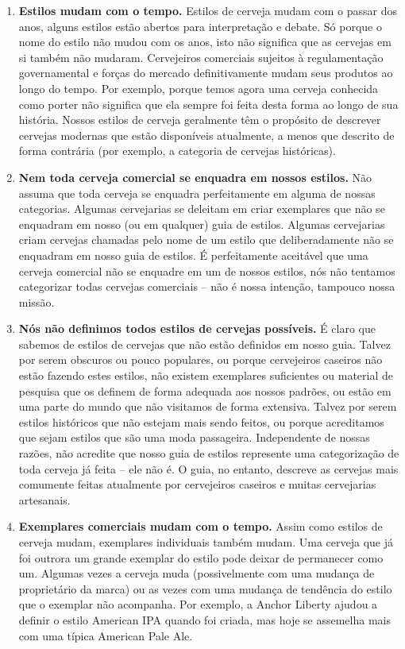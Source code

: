 \begin{enumerate}
\item \textbf{Estilos mudam com o tempo.} Estilos de cerveja mudam com o passar dos anos, alguns estilos estão abertos para interpretação e debate. Só porque o nome do estilo não mudou com os anos, isto não significa que as cervejas em si também não mudaram. Cervejeiros comerciais sujeitos à regulamentação governamental e forças do mercado definitivamente mudam seus produtos ao longo do tempo. Por exemplo, porque temos agora uma cerveja conhecida como porter não significa que ela sempre foi feita desta forma ao longo de sua história. Nossos estilos de cerveja geralmente têm o propósito de descrever cervejas modernas que estão disponíveis atualmente, a menos que descrito de forma contrária (por exemplo, a categoria de cervejas históricas).
\item \textbf{Nem toda cerveja comercial se enquadra em nossos estilos.} Não assuma que toda cerveja se enquadra perfeitamente em alguma de nossas categorias. Algumas cervejarias se deleitam em criar exemplares que não se enquadram em nosso (ou em qualquer) guia de estilos. Algumas cervejarias criam cervejas chamadas pelo nome de um estilo que deliberadamente não se enquadram em nosso guia de estilos. É perfeitamente aceitável que uma cerveja comercial não se enquadre em um de nossos estilos, nós não tentamos categorizar todas cervejas comerciais – não é nossa intenção, tampouco nossa missão.
\item \textbf{Nós não definimos todos estilos de cervejas possíveis.} É claro que sabemos de estilos de cervejas que não estão definidos em nosso guia. Talvez por serem obscuros ou pouco populares, ou porque cervejeiros caseiros não estão fazendo estes estilos, não existem exemplares suficientes ou material de pesquisa que os definem de forma adequada aos nossos padrões, ou estão em uma parte do mundo que não visitamos de forma extensiva. Talvez por serem estilos históricos que não estejam mais sendo feitos, ou porque acreditamos que sejam estilos que são uma moda passageira. Independente de nossas razões, não acredite que nosso guia de estilos represente uma categorização de toda cerveja já feita – ele não é. O guia, no entanto, descreve as cervejas mais comumente feitas atualmente por cervejeiros caseiros e muitas cervejarias artesanais.
\item \textbf{Exemplares comerciais mudam com o tempo.} Assim como estilos de cerveja mudam, exemplares individuais também mudam. Uma cerveja que já foi outrora um grande exemplar do estilo pode deixar de permanecer como um. Algumas vezes a cerveja muda (possivelmente com uma mudança de proprietário da marca) ou as vezes com uma mudança de tendência do estilo que o exemplar não acompanha. Por exemplo, a Anchor Liberty ajudou a definir o estilo American IPA quando foi criada, mas hoje se assemelha mais com uma típica American Pale Ale.

\end{enumerate}
